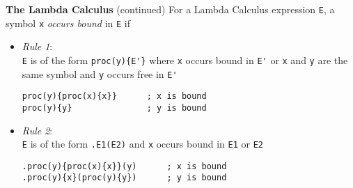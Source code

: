\begin{minipage}[t]{\sw}
\slidenumber
\LARGE
{\bf The Lambda Calculus} (continued)\exx
\emm{\Large\LightBox{\MYlambda}}\exx
For a Lambda Calculus expression \verb'E', a symbol \verb'x'
{\em occurs bound} in \verb'E' if
\begin{itemize}
\item   {\em Rule 1}:\\
	\verb'E' is of the form \verb:proc(y){E'}:
	where \verb'x' occurs bound in \verb:E':
        or \verb'x' and \verb'y' are the same symbol
	and \verb'y' occurs free in \verb:E':

	\emm\verb'proc(y){proc(x){x}}      ; x is bound'\\
	\emm\verb'proc(y){y}               ; y is bound'\\

\item   {\em Rule 2}:\\
	\verb'E' is of the form \verb'.E1(E2)'
	and \verb'x' occurs bound in \verb'E1' or \verb'E2'

	\emm\verb'.proc(y){proc(x){x}}(y)      ; x is bound'\\
	\emm\verb'.proc(y){x}(proc(y){y})      ; y is bound'\\
\end{itemize}
\end{minipage}
\clearpage
